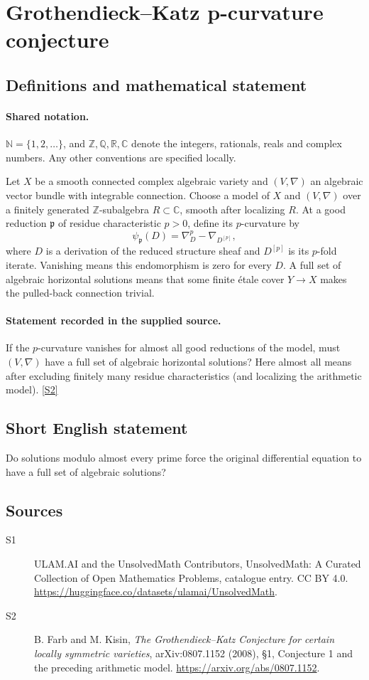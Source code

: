 \documentclass[11pt]{article}
\newcommand{\sref}[2]{\hyperlink{source:#1:#2}{[S#2]}}
\begin{document}
\section{Grothendieck–Katz p-curvature conjecture}\label{statement}

\subsection{Definitions and mathematical statement}

\paragraph{Shared notation.}$\mathbb N=\{1,2,\ldots\}$, and $\mathbb Z,\mathbb Q,\mathbb R,\mathbb C$ denote the integers, rationals, reals and complex numbers. Any other conventions are specified locally.


Let $X$ be a smooth connected complex algebraic variety and $(V,\nabla)$ an algebraic vector bundle with integrable connection. Choose a model of $X$ and $(V,\nabla)$ over a finitely generated $\mathbb Z$-subalgebra $R\subset\mathbb C$, smooth after localizing $R$. At a good reduction $\mathfrak p$ of residue characteristic $p>0$, define its $p$-curvature by
\[\psi_{\mathfrak p}(D)=\nabla_D^p-\nabla_{D^{[p]}},
\]
where $D$ is a derivation of the reduced structure sheaf and $D^{[p]}$ is its $p$-fold iterate. Vanishing means this endomorphism is zero for every $D$. A full set of algebraic horizontal solutions means that some finite étale cover $Y\to X$ makes the pulled-back connection trivial.
\paragraph{Statement recorded in the supplied source.}
If the $p$-curvature vanishes for almost all good reductions of the model, must $(V,\nabla)$ have a full set of algebraic horizontal solutions? Here almost all means after excluding finitely many residue characteristics (and localizing the arithmetic model). \sref{statement}{2}
\subsection{Short English statement}
Do solutions modulo almost every prime force the original differential equation to have a full set of algebraic solutions?
\subsection{Sources}
\begin{description}
\item[\hypertarget{source:statement:1}{S1}] ULAM.AI and the UnsolvedMath Contributors, UnsolvedMath: A Curated Collection of Open Mathematics Problems, catalogue entry. CC BY 4.0. \url{https://huggingface.co/datasets/ulamai/UnsolvedMath}.
\item[\hypertarget{source:statement:2}{S2}] B. Farb and M. Kisin, \emph{The Grothendieck--Katz Conjecture for certain locally symmetric varieties}, arXiv:0807.1152 (2008), §1, Conjecture 1 and the preceding arithmetic model. \url{https://arxiv.org/abs/0807.1152}.
\end{description}
\label{end:statement}
\end{document}
